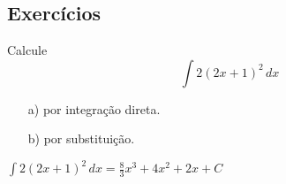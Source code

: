 

\subsection{Exercícios}


\begin{exer}
  Calcule
  \begin{equation}
    \int 2(2x+1)^2\,dx
  \end{equation}
  \begin{enumerate}[a)]
  \item[a)] por integração direta.
  \item[b)] por substituição.
  \end{enumerate}
\end{exer}
\begin{resp}
  $\displaystyle \int 2(2x+1)^2\,dx = \frac{8}{3}x^3 + 4x^2 + 2x + C$
\end{resp}

